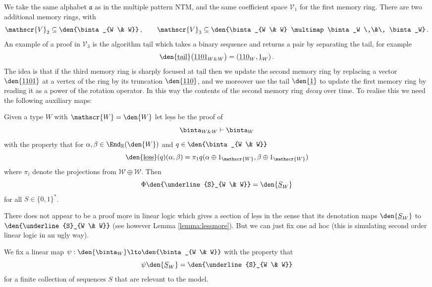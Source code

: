 We take the same alphabet $\mathfrak{a}$ as in the multiple pattern NTM, and the same coefficient space $\mathscr{V}_1$ for the first memory ring. There are two additional memory rings, with
\[
\mathscr{V}_2 \subseteq \den{\binta_{W \& W}}\,, \qquad \mathscr{V}_3 \subseteq \den{\binta_{W \& W} \multimap \binta_W \,\&\, \binta_W}\,.
\]
An example of a proof in $\mathscr{V}_3$ is the algorithm $\underline{\mathrm{tail}}$ which takes a binary sequence and returns a pair by separating the tail, for example
\[
\den{\underline{\mathrm{tail}}}\big( \underline{1101}_{W \& W} \big) = (\underline{110}_W, \underline{1}_W)\,.
\]
The idea is that if the third memory ring is sharply focused at $\underline{\mathrm{tail}}$ then we update the second memory ring by replacing a vector $\den{\underline{1101}}$ at a vertex of the ring by its truncation $\den{\underline{110}}$, and we moreover use the tail $\den{\underline{1}}$ to update the first memory ring by reading it as a power of the rotation operator. In this way the contents of the second memory ring \emph{decay} over time. To realise this we need the following auxiliary maps:

\begin{definition}\label{definition:proofless} Given a type $W$ with $\mathscr{W} = \den{W}$ let $\underline{\mathrm{less}}$ be the proof of
\[
\binta_{W \& W} \vdash \binta_W
\]
with the property that for $\alpha, \beta \in \End_{\mathbb{R}}(\den{W})$ and $q \in \den{\binta_{W \& W}}$
\[
\den{\underline{\mathrm{less}}}(q)( \alpha, \beta ) = \pi_1 q( \alpha \oplus 1_{\mathscr{W}}, \beta \oplus 1_{\mathscr{W}} )
\]
where $\pi_i$ denote the projections from $\mathscr{W} \oplus \mathscr{W}$. Then
\[
\Phi \den{\underline{S}_{W \& W}} = \den{\underline{S}_W}
\]
for all $S \in \{0,1\}^*$.
\end{definition}

There does not appear to be a proof $\underline{\mathrm{more}}$ in linear logic which gives a section of $\underline{\mathrm{less}}$ in the sense that its denotation maps $\den{\underline{S}_W}$ to $\den{\underline{S}_{W \& W}}$ (see however Lemma \ref{lemma:lessmore}). But we can just fix one ad hoc (this is simulating second order linear logic in an ugly way).

\begin{definition} We fix a linear map $\psi: \den{\binta_W} \lto \den{\binta_{W \& W}}$ with the property that
\[
\psi \den{\underline{S}_W} = \den{\underline{S}_{W \& W}}
\]
for a finite collection of sequences $S$ that are relevant to the model.
\end{definition}

